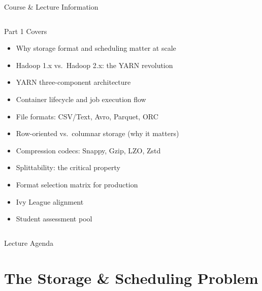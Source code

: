 \documentclass[aspectratio=169,10pt]{beamer}
\begin{document}
\begin{frame}{Course \& Lecture Information}
\begin{columns}[T]
      \begin{exampleblock}{Part 1 Covers}
        \begin{itemize}
          \item Why storage format and scheduling matter at scale
          \item Hadoop 1.x vs.\ Hadoop 2.x: the YARN revolution
          \item YARN three-component architecture
          \item Container lifecycle and job execution flow
          \item File formats: CSV/Text, Avro, Parquet, ORC
          \item Row-oriented vs.\ columnar storage (why it matters)
          \item Compression codecs: Snappy, Gzip, LZO, Zstd
          \item Splittability: the critical property
          \item Format selection matrix for production
          \item Ivy League alignment
          \item Student assessment pool
        \end{itemize}
      \end{exampleblock}
  \end{columns}
\end{frame}

\begin{frame}{Lecture Agenda}
  \tableofcontents
\end{frame}

\section{The Storage \& Scheduling Problem}
\end{document}
